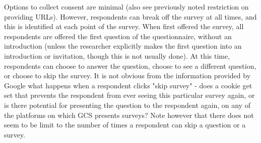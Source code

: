 Options to collect consent are minimal (also see previously noted restriction on providing URLs). However, respondents can break off the survey at all times, and this is identified at each point of the survey. When first offered the survey, all respondents are offered the first question of the questionnaire, without an introduction (unless the researcher explicitly makes the first question into an introduction or invitation, though this is not usually done). At this time, respondents can choose to answer the question, choose to see a different question, or choose to skip the survey. 
It is not obvious from the information provided by Google what happens when a respondent clicks "skip survey" - does a cookie get set that prevents the respondent from ever seeing this particular survey again, or is there potential for presenting the question to the respondent again, on any of the platforms on which \ac{GCS} presents surveys? Note however that there does not seem to be  limit to the number of times a respondent can skip a question or a survey. 

